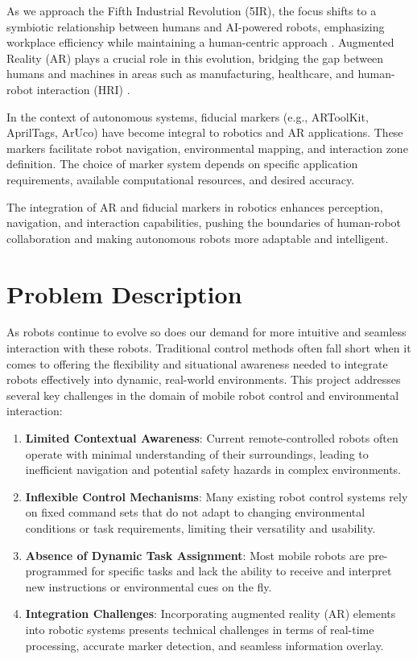 As we approach the Fifth Industrial Revolution (5IR), the focus shifts to a symbiotic relationship between humans and AI-powered robots, emphasizing workplace efficiency while maintaining a human-centric approach \cite{Samuels2023}. Augmented Reality (AR) plays a crucial role in this evolution, bridging the gap between humans and machines in areas such as manufacturing, healthcare, and human-robot interaction (HRI) \cite{Dalle2021}.

In the context of autonomous systems, fiducial markers (e.g., ARToolKit, AprilTags, ArUco) have become integral to robotics and AR applications. These markers facilitate robot navigation, environmental mapping, and interaction zone definition. The choice of marker system depends on specific application requirements, available computational resources, and desired accuracy.

The integration of AR and fiducial markers in robotics enhances perception, navigation, and interaction capabilities, pushing the boundaries of human-robot collaboration and making autonomous robots more adaptable and intelligent.





\section{\label{sec:probdesc}Problem Description}

As robots continue to evolve so does our demand for more intuitive and seamless interaction with these robots. Traditional control methods often fall short when it comes to offering the flexibility and situational awareness needed to integrate robots effectively into dynamic, real-world environments. This project addresses several key challenges in the domain of mobile robot control and environmental interaction:

\begin{enumerate}
    \item \textbf{Limited Contextual Awareness}: Current remote-controlled robots often operate with minimal understanding of their surroundings, leading to inefficient navigation and potential safety hazards in complex environments.
    \item \textbf{Inflexible Control Mechanisms}: Many existing robot control systems rely on fixed command sets that do not adapt to changing environmental conditions or task requirements, limiting their versatility and usability.
    \item \textbf{Absence of Dynamic Task Assignment}: Most mobile robots are pre-programmed for specific tasks and lack the ability to receive and interpret new instructions or environmental cues on the fly.
    \item \textbf{Integration Challenges}: Incorporating augmented reality (AR) elements into robotic systems presents technical challenges in terms of real-time processing, accurate marker detection, and seamless information overlay.
\end{enumerate}


